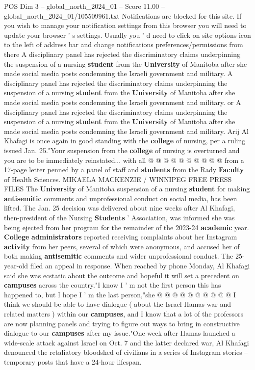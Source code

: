 \begin{textsample}{POS Dim 3 – global\_north\_2024\_01 – Score 11.00 – global\_north\_2024\_01/105509961.txt}  \label{ex:f3_pos_227}
Notifications are blocked for this site.
If you wish to manage your notification settings from this browser you will need to update your browser ' s settings.
Usually you ' d need to click on site options icon to the left of address bar and change notifications preferences/permissions from there A disciplinary panel has rejected the discriminatory claims underpinning the suspension of a nursing \textbf{student} from the \textbf{University} of Manitoba after she made social media posts condemning the Israeli government and military.
A disciplinary panel has rejected the discriminatory claims underpinning the suspension of a nursing \textbf{student} from the \textbf{University} of Manitoba after she made social media posts condemning the Israeli government and military. or A disciplinary panel has rejected the discriminatory claims underpinning the suspension of a nursing \textbf{student} from the \textbf{University} of Manitoba after she made social media posts condemning the Israeli government and military.
Arij Al Khafagi is once again in good standing with the \textbf{college} of nursing, per a ruling issued Jan. 25."Your suspension from the \textbf{college} of nursing is overturned and you are to be immediately reinstated... with all @ @ @ @ @ @ @ @ @ @ from a 17-page letter penned by a panel of staff and \textbf{students} from the Rady \textbf{Faculty} of Health Sciences.
MIKAELA MACKENZIE / WINNIPEG FREE PRESS FILES The \textbf{University} of Manitoba suspension of a nursing \textbf{student} for making \textbf{antisemitic} comments and unprofessional conduct on social media, has been lifted.
The Jan. 25 decision was delivered about nine weeks after Al Khafagi, then-president of the Nursing \textbf{Students} ' Association, was informed she was being ejected from her program for the remainder of the 2023-24 \textbf{academic} year. \textbf{College} \textbf{administrators} reported receiving complaints about her Instagram \textbf{activity} from her peers, several of which were anonymous, and accused her of both making \textbf{antisemitic} comments and wider unprofessional conduct.
The 25-year-old filed an appeal in response.
When reached by phone Monday, Al Khafagi said she was ecstatic about the outcome and hopeful it will set a precedent on \textbf{campuses} across the country."I know I ' m not the first person this has happened to, but I hope I ' m the last person,"she @ @ @ @ @ @ @ @ @ @ I think we should be able to have dialogue ( about the Israel-Hamas war and related matters ) within our \textbf{campuses}, and I know that a lot of the professors are now planning panels and trying to figure out ways to bring in constructive dialogue to our \textbf{campuses} after my issue."One week after Hamas launched a wide-scale attack against Israel on Oct. 7 and the latter declared war, Al Khafagi denounced the retaliatory bloodshed of civilians in a series of Instagram stories -- temporary posts that have a 24-hour lifespan.

\end{textsample}
